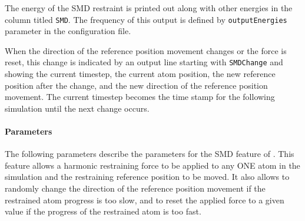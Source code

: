 The energy of the SMD restraint is printed out along with other
energies in the column titled {\tt SMD}. The frequency of this output
is defined by {\tt outputEnergies} parameter in the configuration
file. 

When the direction of the reference position movement changes or the
force is reset, this change is indicated by an output line starting
with {\tt SMDChange} and showing the current timestep, the current
atom position, the new reference position after the change, and the
new direction of the reference position movement. The current timestep
becomes the time stamp for the following simulation until the next
change occurs.

\paragraph*{Parameters}

The following parameters describe the parameters for the 
SMD feature of \NAMD.
This feature allows a harmonic restraining force to be applied
to any ONE atom in the simulation and the restraining reference
position to be moved. It also allows to randomly change the direction
of the reference position movement if the restrained atom progress is
too slow, and to reset the applied force to a given value if the
progress of the restrained atom is too fast.

